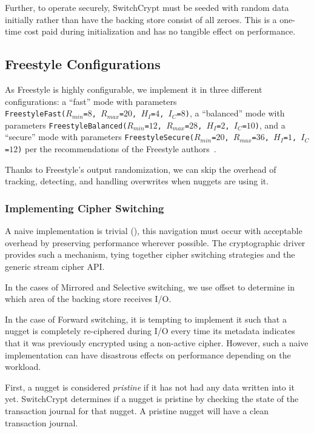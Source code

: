 Further, to operate securely, SwitchCrypt must be seeded with random data
initially rather than have the backing store consist of all zeroes. This is a
one-time cost paid during initialization and has no tangible effect on
performance.

\subsection{Freestyle Configurations}

As Freestyle is highly configurable, we implement it in three different
configurations: a ``fast'' mode with parameters
\\\texttt{FreestyleFast($R_{min}$=$8$, $R_{max}$=$20$, $H_I$=$4$, $I_C$=$8$)}, a
``balanced'' mode with parameters \texttt{FreestyleBalanced($R_{min}$=$12$,
$R_{max}$=$28$, $H_I$=$2$, $I_C$=$10$)}, and a ``secure'' mode with parameters
\texttt{FreestyleSecure($R_{min}$=$20$, $R_{max}$=$36$, $H_I$=$1$,
$I_C$=$12$)} per the recommendations of the Freestyle authors~\cite{Freestyle}.

Thanks to Freestyle's output randomization, we can skip the overhead of
tracking, detecting, and handling overwrites when nuggets are using it.

\subsubsection{Implementing Cipher Switching}

A naive implementation is trivial (), this navigation must occur with acceptable overhead by preserving
performance wherever possible. The cryptographic driver provides such a
mechanism, tying together cipher switching strategies and the generic stream
cipher API.

In the cases of Mirrored and Selective switching, we use offset to determine in
which area of the backing store receives I/O.

In the case of Forward switching, it is tempting to implement it such that a
nugget is completely re-ciphered during I/O every time its metadata indicates
that it was previously encrypted using a non-active cipher. However, such a
naive implementation can have disastrous effects on performance depending on the
workload.

First, a nugget is considered \emph{pristine} if it has not had any data written
into it yet. SwitchCrypt determines if a nugget is pristine by checking the
state of the transaction journal for that nugget. A pristine nugget will have a
clean transaction journal.

